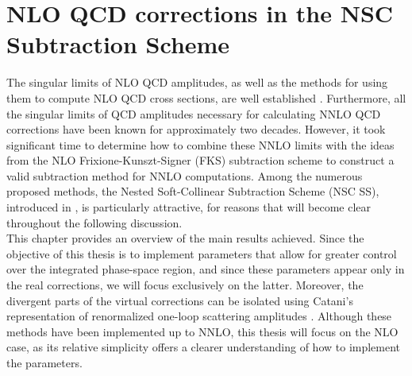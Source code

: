 \documentclass[a4paper, 12pt]{book}
\begin{document}
\chapter{NLO QCD corrections in the NSC Subtraction Scheme}
\label{NSC-SS}
The singular limits of NLO QCD amplitudes, as well as the methods for using them to compute NLO QCD cross sections, are well established \cite{Frixione:1995ms,Catani:1996vz}. Furthermore, all the singular limits of QCD amplitudes necessary for calculating NNLO QCD corrections have been known for approximately two decades. However, it took significant time to determine how to combine these NNLO limits with the ideas from the NLO Frixione-Kunszt-Signer (FKS) subtraction scheme \cite{Frixione:1995ms} to construct a valid subtraction method for NNLO computations. Among the numerous proposed methods, the Nested Soft-Collinear Subtraction Scheme (NSC SS), introduced in \cite{Caola:2017dug}, is particularly attractive, for reasons that will become clear throughout the following discussion. \\
This chapter provides an overview of the main results achieved. Since the objective of this thesis is to implement parameters that allow for greater control over the integrated phase-space region, and since these parameters appear only in the real corrections, we will focus exclusively on the latter. Moreover, the divergent parts of the virtual corrections can be isolated using Catani's representation of renormalized one-loop scattering amplitudes \cite{Catani:1998bh}. Although these methods have been implemented up to NNLO, this thesis will focus on the NLO case, as its relative simplicity offers a clearer understanding of how to implement the parameters.
\end{document}
